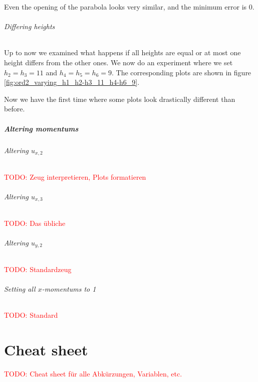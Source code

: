 \documentclass{article}
\newcommand{\todo}[1]{\textcolor{red}{TODO: #1}}
\begin{document}


Even the opening of the parabola looks very similar, and the minimum error is 0.

\paragraph{Differing heights}

Up to now we examined what happens if all heights are equal or at most one height differs from the other ones. We now do an experiment where we set $h_2=h_3=11$ and $h_4=h_5=h_6=9$. The corresponding plots are shown in figure \ref{fig:ord2_varying_h1_h2-h3_11_h4-h6_9}.



Now we have the first time where some plots look drastically different than before.

\subsubsection{Altering momentums}
\label{sec:stiffness-analysis-ord2-altering-momentums}

\paragraph{Altering $u_{x,2}$}

\todo{Zeug interpretieren, Plots formatieren}



\paragraph{Altering $u_{x,3}$}

\todo{Das übliche}



\paragraph{Altering $u_{y,2}$}

\todo{Standardzeug}



\paragraph{Setting all $x$-momentums to 1}

\todo{Standard}



\cleardoublepage{}



\appendix

\part{Cheat sheet}
\label{part:cheat-sheet}

\todo{Cheat sheet für alle Abkürzungen, Variablen, etc.}
\end{document}
